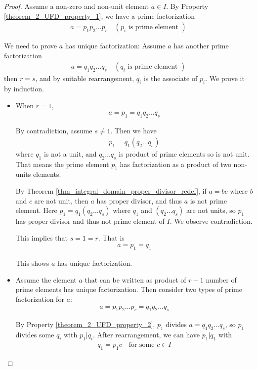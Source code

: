 \documentclass[utf8]{ctexbook}
\begin{document}
\begin{proof}
Assume a non-zero and non-unit element $a \in I$. By Property \ref{theorem_2_UFD_property_1}, we have a prime factorization
\begin{align*}
a = p_1 p_2 \ldots p_r \quad (p_i \mbox{ is prime element })
\end{align*}

We need to prove $a$ has unique factorization: Assume $a$ has another prime factorization
\begin{align*}
a = q_1 q_2 \ldots q_s \quad (q_i \mbox{ is prime element })
\end{align*} 
then $r= s $, and by suitable rearrangement, $q_i$ is the associate of $p_i$. We prove it by induction.
\begin{itemize}
\item{When $r=1$,
\begin{align*}
a = p_1 = q_1 q_2 \ldots q_s
\end{align*}

By contradiction, assume $s \neq 1$. Then we have
\begin{align*}
p_1 = q_1 (q_2 \ldots q_s)
\end{align*}
where $q_1$ is not a unit, and $q_2 \ldots q_s$ is product of prime elements so is not unit. That means the prime element $p_1$ has factorization as a product of two non-units elements.

By Theorem 
\ref{thm_integral_domain_proper_divisor_redef}, if $a = bc$ where $b$ and $c$ are not unit, then $a$ has proper divisor, and thus $a$ is not prime element. Here $p_1 = q_1 (q_2 \ldots q_s)$ where $q_1$ and $(q_2 \ldots q_s)$ are not units, so $p_1$ has proper divisor and thus not prime element of $I$. We observe contradiction. 

This implies that $s=1 = r$. That is
\begin{align*}
a = p_1 = q_1
\end{align*}

This shows $a$ has unique factorization.
}
\item{Assume the element $a$ that can be written as product of $ r - 1 $ number of prime elements has unique factorization. Then consider two types of prime factorization for $a$:
\begin{align*}
a = p_1 p_2 \ldots p_r = q_1 q_2 \ldots q_s
\end{align*}   

By Property \ref{theorem_2_UFD_property_2}, $p_1$ divides $a = q_1 q_2 \ldots q_s$, so $p_1$ divides some $q_i$ with $p_1 | q_i$. After rearrangement, we can have $p_1 | q_1$ with
\begin{align*}
q_1 = p_1 c \quad \mbox{for some } c \in I
\end{align*}

}
\end{itemize}
\end{proof}
\end{document}
